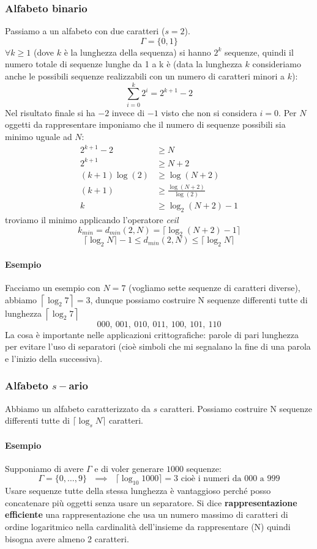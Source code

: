\subsubsection{Alfabeto binario}
Passiamo a un alfabeto con due caratteri ($s = 2$). 
\[\Gamma = \{0, 1\}\]
$\forall k \geq 1$ (dove $k$ è la lunghezza della sequenza) si hanno $2^{k}$ sequenze, quindi il numero totale di sequenze lunghe da 1 a k è (data la lunghezza $k$ consideriamo anche le possibili sequenze realizzabili con un numero di caratteri minori a $k$):
$$
\sum^{k}_{i=0} 2^{i} = 2^{k+1} - 2
$$
Nel risultato finale si ha $-2$ invece di $-1$ visto che non si considera $i=0$. Per $N$ oggetti da rappresentare imponiamo che il numero di sequenze possibili sia minimo uguale ad $N$:
\begin{align*}
	2^{k+1}-2 &\geq N\\
	2^{k+1} &\geq N+2\\
	(k+1)\log(2) &\geq \log(N+2)\\
	(k+1) &\geq \frac{\log(N+2)}{\log(2)}\\
	k&\geq \log_2(N+2)-1
\end{align*}
troviamo il minimo applicando l'operatore \emph{ceil}
$$ k_{min}=d_{min}(2, N) = \lceil \log_{2}(N+2) - 1 \rceil $$
$$ \lceil \log_{2}N \rceil - 1 \leq d_{min}(2, N) \leq \lceil \log_{2}N \rceil $$

\paragraph{Esempio} Facciamo un esempio con $N=7$ (vogliamo sette sequenze di caratteri diverse), abbiamo 
$\left\lceil{\log}_2{7}\right\rceil=3$, dunque possiamo costruire N sequenze differenti tutte di lunghezza $\left\lceil{\log}_2{7}\right\rceil$
\[000,\ 001,\ 010,\ 011,\ 100,\ 101,\ 110\]La cosa è importante nelle applicazioni crittografiche: parole di pari lunghezza per evitare l’uso di separatori (cioè simboli che mi segnalano la fine di una parola e l’inizio della successiva).


\subsubsection{Alfabeto $s-$ario}
Abbiamo un alfabeto caratterizzato da $s$ caratteri. Possiamo costruire N sequenze differenti tutte di $ \lceil \log_{s}N \rceil $ caratteri.

\paragraph{Esempio}  Supponiamo di avere $\Gamma$ e di voler generare $1000$ sequenze:
\[\text{$\Gamma = \{0, \dots, 9 \}$ $\implies$ $\lceil \log_{10}1000\rceil = 3 $ cioè i numeri da 000 a 999}\]
Usare sequenze tutte della stessa lunghezza è vantaggioso perché posso concatenare più oggetti senza usare un separatore. Si dice \textbf{rappresentazione efficiente} una rappresentazione che usa un numero massimo di caratteri di ordine logaritmico nella cardinalità dell'insieme da rappresentare (N) quindi bisogna avere almeno 2 caratteri.

